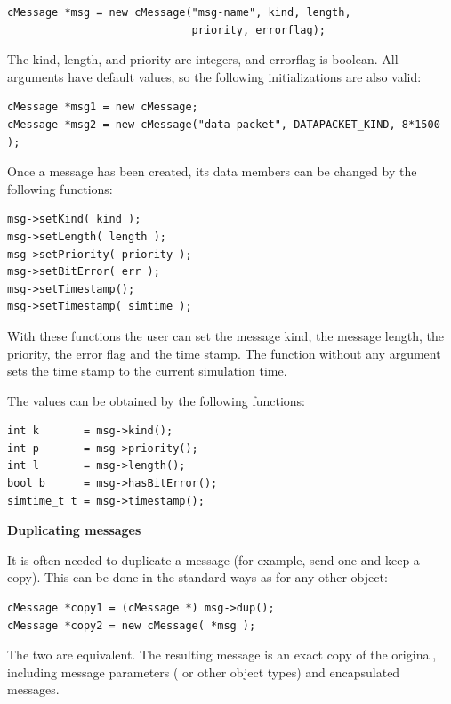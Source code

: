 \begin{verbatim}
cMessage *msg = new cMessage("msg-name", kind, length,
                             priority, errorflag);
\end{verbatim}


The kind, length, and priority are integers, and errorflag is boolean.
All arguments have default values, so the following initializations
are also valid:

\begin{verbatim}
cMessage *msg1 = new cMessage;
cMessage *msg2 = new cMessage("data-packet", DATAPACKET_KIND, 8*1500 );
\end{verbatim}


Once a message has been created, its data members can be changed by the following functions:

\begin{verbatim}
msg->setKind( kind );
msg->setLength( length );
msg->setPriority( priority );
msg->setBitError( err );
msg->setTimestamp();
msg->setTimestamp( simtime );
\end{verbatim}


With these functions the user can set the message
kind, the message length,
the priority, the error
flag and the time stamp. The  function without any argument
sets the time stamp to the current simulation time.


The values can be obtained by the following functions:

\begin{verbatim}
int k       = msg->kind();
int p       = msg->priority();
int l       = msg->length();
bool b      = msg->hasBitError();
simtime_t t = msg->timestamp();
\end{verbatim}


\textbf{Duplicating messages}


It is often needed to duplicate a message (for example, send
one and keep a copy). This can be done in the standard ways as
for any other {\opp} object:

\begin{verbatim}
cMessage *copy1 = (cMessage *) msg->dup();
cMessage *copy2 = new cMessage( *msg );
\end{verbatim}


The two are equivalent. The resulting message is an exact copy
of the original, including message parameters ( or other
object types) and encapsulated messages.




